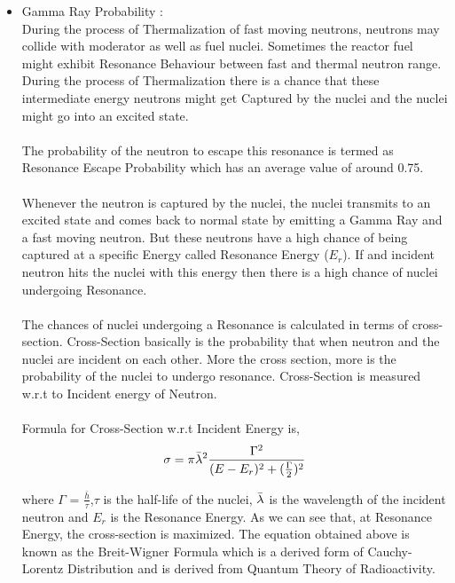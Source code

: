 \documentclass{article}
\begin{document}
\begin{itemize}
\begin{itemize}
\begin{itemize}
        \item Gamma Ray Probability :\\
            During the process of Thermalization of fast moving neutrons, neutrons may collide with moderator as well as fuel nuclei. Sometimes the reactor fuel might exhibit Resonance Behaviour between fast and thermal neutron range. During the process of Thermalization there is a chance that these intermediate energy neutrons might get Captured by the nuclei and the nuclei might go into an excited state.\\
            \\
            The probability of the neutron to escape this resonance is termed as Resonance Escape Probability which has an average value of around 0.75.\cite{cite12}\\
            \\
            Whenever the neutron is captured by the nuclei, the nuclei transmits to an excited state and comes back to normal state by emitting a Gamma Ray and a fast moving neutron. But these neutrons have a high chance of being captured at a specific Energy called Resonance Energy ($E_r$). If and incident neutron hits the nuclei with this energy then there is a high chance of nuclei undergoing Resonance.\\
            \\
            The chances of nuclei undergoing a Resonance is calculated in terms of cross-section. Cross-Section basically is the probability that when neutron and the nuclei are incident on each other. More the cross section, more is the probability of the nuclei to undergo resonance. Cross-Section is measured w.r.t to Incident energy of Neutron.\\
            \\
            Formula for Cross-Section w.r.t Incident Energy is,
            $$\sigma = \pi \Bar{\lambda}^2 \frac{\Gamma^2}{(E - E_r)^2 + (\frac{\Gamma}{2})^2}$$
            
            where $\Gamma$ = $\frac{\bar{h}}{\tau}$,$\tau$ is the half-life of the nuclei, $\Bar{\lambda}$ is the wavelength of the incident neutron and $E_r$ is the Resonance Energy. As we can see that, at Resonance Energy, the cross-section is maximized. The equation obtained above is known as the Breit-Wigner Formula which is a derived form of Cauchy-Lorentz Distribution and is derived from Quantum Theory of Radioactivity.
            
            
                
    \end{itemize}
    
    
   
 \end{itemize}
\end{itemize}
\end{document}

